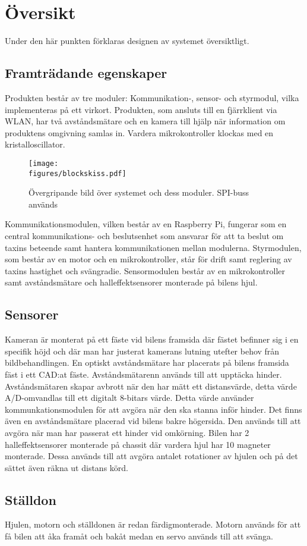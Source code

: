 \documentclass[tekniskrapport/tech.tex]{subfiles}
\begin{document}
\section{Översikt}
Under den här punkten förklaras designen av systemet översiktligt.

\subsection{Framträdande egenskaper}
Produkten består av tre moduler: Kommunikation-, sensor- och styrmodul, vilka
implementeras på ett virkort. Produkten, som ansluts till en fjärrklient via
WLAN, har två avståndsmätare och en kamera till hjälp när information om
produktens omgivning samlas in. Vardera mikrokontroller klockas med en
kristalloscillator.

\begin{figure}[h]
    \centering
    \texttt{[image: \\figures/blockskiss.pdf]}
    \caption{Övergripande bild över systemet och dess moduler. SPI-buss används}
    \label{fig:overview}
\end{figure}

\noindent
Kommunikationsmodulen, vilken består av en Raspberry Pi, fungerar som en
central kommun\-ikations- och beslutsenhet som ansvarar för att ta beslut om
taxins beteende samt hantera kommunikationen mellan modulerna. Styrmodulen,
som består av en motor och en mikrokontroller, står för drift samt reglering
av taxins hastighet och svängradie. Sensormodulen består av en mikrokontroller
samt avståndsmätare och halleffektsensorer monterade på bilens hjul.

\subsection{Sensorer}
Kameran är monterat på ett fäste vid bilens framsida där fästet befinner sig i
en specifik höjd och där man har justerat kamerans lutning utefter behov från
bildbehandlingen. En optiskt avståndsmätare har placerats på bilens framsida
fäst i ett CAD:at fäste. Avståndsmätarenn används till att upptäcka hinder.
Avståndsmätaren skapar avbrott när den har mätt ett distansvärde, detta värde
A/D-omvandlas till ett digitalt 8-bitars värde. Detta värde använder
kommunkationsmodulen för att avgöra när den ska stanna inför hinder. Det finns
även en avståndsmätare placerad vid bilens bakre högersida. Den används till att
avgöra när man har passerat ett hinder vid omkörning. Bilen har 2
halleffektsensorer monterade på chassit där vardera hjul har 10 magneter
monterade. Dessa används till att avgöra antalet rotationer av hjulen och på det
sättet även räkna ut distans körd.

\subsection{Ställdon}
Hjulen, motorn och ställdonen är redan färdigmonterade. Motorn används
för att få bilen att åka framåt och bakåt medan en servo används till att svänga.
\end{document}
